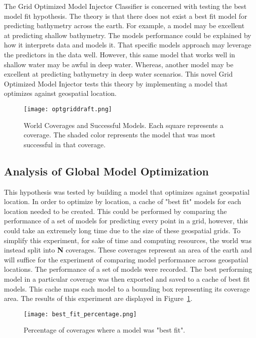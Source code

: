 The Grid Optimized Model Injector Classifier is concerned with testing the best model fit hypothesis.
The theory is that there does not exist a best fit model for predicting bathymetry across the earth.
For example, a model may be excellent at predicting shallow bathymetry.
The models performance could be explained by how it interprets data and models it.
That specific models approach may leverage the predictors in the data well.
However, this same model that works well in shallow water may be awful in deep water.
Whereas, another model may be excellent at predicting bathymetry in deep water scenarios.
This novel Grid Optimized Model Injector tests this theory by implementing a model that optimizes against geospatial location.

\begin{figure}[htp]
    \centering
    \texttt{[image: optgriddraft.png]}
    \caption{World Coverages and Successful Models.
    Each square represents a coverage.
    The shaded color represents the model that was most successful in that coverage.}
    \label{fig:coveragegrid}
\end{figure}

\subsection{Analysis of Global Model Optimization}
This hypothesis was tested by building a model that optimizes against geospatial location.
In order to optimize by location, a cache of "best fit" models for each location needed to be created.
This could be performed by comparing the performance of a set of models for predicting every point in a grid, however, this could take an extremely long time due to the size of these geospatial grids.
To simplify this experiment, for sake of time and computing resources, the world was instead split into \textbf{N} coverages.
These coverages represent an area of the earth and will suffice for the experiment of comparing model performance across geospatial locations.
The performance of a set of models were recorded.
The best performing model in a particular coverage was then exported and saved to a cache of best fit models.
This cache maps each model to a bounding box representing its coverage area.
The results of this experiment are displayed in Figure~\ref{fig:coveragegrid}.

\begin{figure}[htp]
    \centering
    \texttt{[image: best\_fit\_percentage.png]}
    \caption{Percentage of coverages where a model was "best fit".}
    \label{fig:pie_best_fit}
\end{figure}

